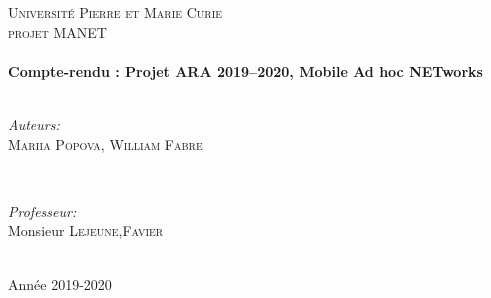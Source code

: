 \documentclass[11pt,a4paper,sans]{report}
\begin{document}
\begin{titlepage}

	\center %


	\textsc{\LARGE Université Pierre et Marie Curie}\\[1.5cm] %
	\textsc{\Large projet MANET}\\[0.5cm] %

	\vfill
	\HRule \\[0.4cm]
	{ \huge \bfseries Compte-rendu : Projet ARA 2019–2020, Mobile Ad hoc NETworks }\\[0.4cm] 
	\HRule \\[1.5cm]
	\vfill

	\begin{minipage}{0.4\textwidth}
		\begin{flushleft} \large
			\emph{Auteurs:}\\
			\textsc{Mariia Popova, William Fabre} 
		\end{flushleft}
	\end{minipage}
	~
	\begin{minipage}{0.4\textwidth}
		\begin{flushright} \large
			\emph{Professeur:} \\
			Monsieur \textsc{Lejeune},\textsc{Favier}
		\end{flushright}
	\end{minipage}\\[2cm]


	{\large Année 2019-2020}\\[2cm] %

\end{titlepage}
\end{document}
